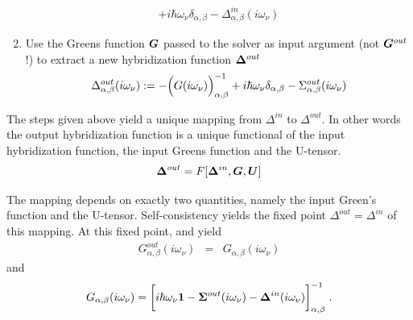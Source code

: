 \documentclass[11pt,a4paper]{report}
\begin{document}
\begin{enumerate}
\begin{eqnarray}
+i\hbar\omega_\nu\delta_{\alpha,\beta}
-\Delta^{in}_{\alpha,\beta}(i\omega_\nu)
\label{eq:sigmaout}
\end{eqnarray}
%
\item Use the Greens function $\bm{G}$ passed
  to the solver as input argument (not
  $\bm{G}^{out}$!)  to extract a new
  hybridization function $\bm{\Delta}^{out}$
\begin{eqnarray}
\Delta^{out}_{\alpha,\beta}(i\omega_\nu)
:=-\Bigl(G(i\omega_\nu)\Bigr)^{-1}_{\alpha,\beta}
+i\hbar\omega_\nu\delta_{\alpha,\beta}-\Sigma^{out}_{\alpha,\beta}(i\omega_\nu)
\label{eq:deltaout}
\end{eqnarray}
\end{enumerate}


The steps given above yield a unique mapping from $\Delta^{in}$ to
$\Delta^{out}$. In other words the output hybridization function is a
unique functional of the input hybridization function, the input
Greens function and the U-tensor.
\begin{eqnarray}
\bm{\Delta}^{out}=F[\bm{\Delta}^{in},\bm{G},\bm{U}]
\end{eqnarray}


The mapping depends on exactly two quantities, namely
the input Green's function and the U-tensor. Self-consistency yields the 
fixed point $\Delta^{out}=\Delta^{in}$ of this mapping.
At this fixed point,  and  yield
\begin{eqnarray}
G^{out}_{\alpha,\beta}(i\omega_\nu)&=&G_{\alpha,\beta}(i\omega_\nu)
\end{eqnarray}
and 
\begin{eqnarray}
G_{\alpha,\beta}(i\omega_\nu)
=\biggl[
i\hbar\omega_\nu\bm{1}
-\bm{\Sigma}^{out}(i\omega_\nu)
-\bm{\Delta}^{in}(i\omega_\nu)
\biggr]^{-1}_{\alpha,\beta}
\;.
\end{eqnarray}


\printindex
\clearpage
 
 
\end{document}
